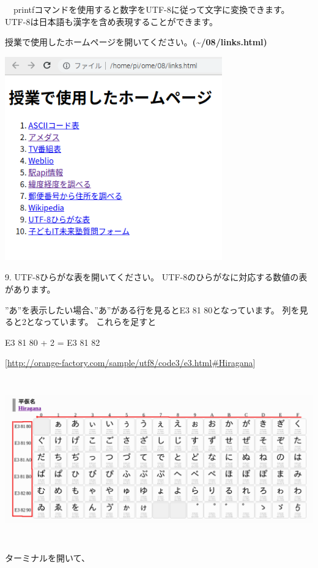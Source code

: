\documentclass[a4paper,12pt,dvipdfmx]{jarticle}
\begin{document}
\ \ printfコマンドを使用すると数字をUTF-8に従って文字に変換できます。
UTF-8は日本語も漢字を含め表現することができます。

授業で使用したホームページを開いてください。\textbf{(\~{}/08/links.html)}



\begin{center}
\includegraphics[width=9.398cm,height=8.784cm]{textbook-img017.png}

\end{center}


\bigskip


\bigskip

9.
UTF-8ひらがな表を開いてください。
UTF-8のひらがなに対応する数値の表があります。

”あ”を表示したい場合、”あ”がある行を見るとE3
81
80となっています。
列を見ると2となっています。
これらを足すと

E3 81 80 + 2 = E3 81 82

[\url{http://orange-factory.com/sample/utf8/code3/e3.html#Hiragana}]

\begin{center}
\includegraphics[width=17.006cm,height=7.049cm]{textbook-img018.png}

\end{center}
ターミナルを開いて、
\end{document}
